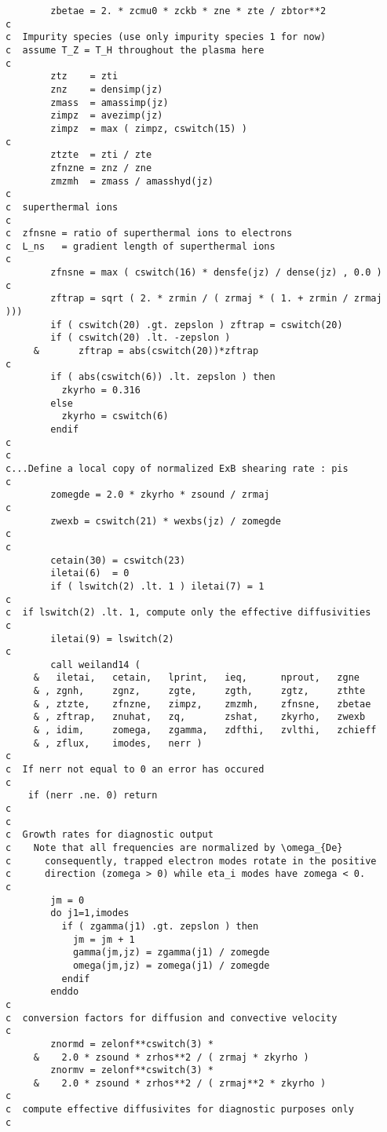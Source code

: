 \begin{verbatim}
        zbetae = 2. * zcmu0 * zckb * zne * zte / zbtor**2
c
c  Impurity species (use only impurity species 1 for now)
c  assume T_Z = T_H throughout the plasma here
c
        ztz    = zti
        znz    = densimp(jz)
        zmass  = amassimp(jz)
        zimpz  = avezimp(jz)
        zimpz  = max ( zimpz, cswitch(15) )
c
        ztzte  = zti / zte
        zfnzne = znz / zne
        zmzmh  = zmass / amasshyd(jz)
c
c  superthermal ions
c
c  zfnsne = ratio of superthermal ions to electrons
c  L_ns   = gradient length of superthermal ions
c
        zfnsne = max ( cswitch(16) * densfe(jz) / dense(jz) , 0.0 )
c
        zftrap = sqrt ( 2. * zrmin / ( zrmaj * ( 1. + zrmin / zrmaj )))
        if ( cswitch(20) .gt. zepslon ) zftrap = cswitch(20)
        if ( cswitch(20) .lt. -zepslon )
     &       zftrap = abs(cswitch(20))*zftrap
c
        if ( abs(cswitch(6)) .lt. zepslon ) then
          zkyrho = 0.316
        else
          zkyrho = cswitch(6)
        endif
c
c
c...Define a local copy of normalized ExB shearing rate : pis
c
        zomegde = 2.0 * zkyrho * zsound / zrmaj 
c
        zwexb = cswitch(21) * wexbs(jz) / zomegde 
c
c
        cetain(30) = cswitch(23)
        iletai(6)  = 0
        if ( lswitch(2) .lt. 1 ) iletai(7) = 1
c
c  if lswitch(2) .lt. 1, compute only the effective diffusivities
c
        iletai(9) = lswitch(2)
c
        call weiland14 ( 
     &   iletai,   cetain,   lprint,   ieq,      nprout,   zgne
     & , zgnh,     zgnz,     zgte,     zgth,     zgtz,     zthte
     & , ztzte,    zfnzne,   zimpz,    zmzmh,    zfnsne,   zbetae
     & , zftrap,   znuhat,   zq,       zshat,    zkyrho,   zwexb
     & , idim,     zomega,   zgamma,   zdfthi,   zvlthi,   zchieff
     & , zflux,    imodes,   nerr )
c
c  If nerr not equal to 0 an error has occured
c
	if (nerr .ne. 0) return
c
c
c  Growth rates for diagnostic output
c    Note that all frequencies are normalized by \omega_{De}
c      consequently, trapped electron modes rotate in the positive
c      direction (zomega > 0) while eta_i modes have zomega < 0.
c
        jm = 0
        do j1=1,imodes
          if ( zgamma(j1) .gt. zepslon ) then
            jm = jm + 1
            gamma(jm,jz) = zgamma(j1) / zomegde
            omega(jm,jz) = zomega(j1) / zomegde
          endif
        enddo
c
c  conversion factors for diffusion and convective velocity
c
        znormd = zelonf**cswitch(3) *
     &    2.0 * zsound * zrhos**2 / ( zrmaj * zkyrho )
        znormv = zelonf**cswitch(3) *
     &    2.0 * zsound * zrhos**2 / ( zrmaj**2 * zkyrho )
c
c  compute effective diffusivites for diagnostic purposes only
c

\end{verbatim}
